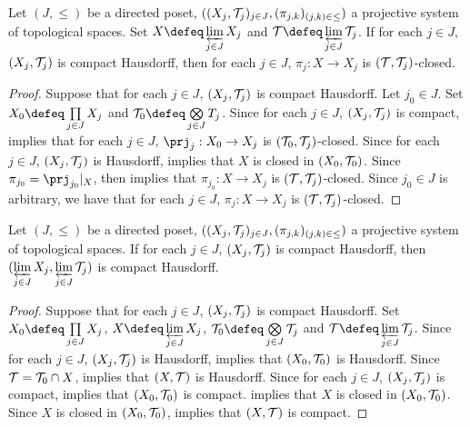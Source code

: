 \documentclass{book}
\begin{document}
\begin{ex} 
	Let $(J, \leq)$ be a directed poset, $((X_j, \mathcal{T}_j)_{j \in J}, (\pi_{j,k})_{(j,k) \in \leq})$ a projective system of topological spaces. Set $X \defeq \varprojlim\limits_{j \in J} X_j$ and $\MT \defeq \varprojlim\limits_{j \in J} \MT_j$. If for each $j \in J$, $(X_j, \mathcal{T}_j)$ is compact Hausdorff, then for each $j \in J$, $\pi_j: X \rightarrow X_j$ is $(\mathcal{T}, \mathcal{T}_j)$-closed.
\end{ex}

\begin{proof}
	Suppose that for each $j \in J$, $(X_j, \mathcal{T}_j)$ is compact Hausdorff. Let $j_0 \in J$. Set $X_0 \defeq \prod\limits_{j \in J} X_j$ and $\MT_0 \defeq \bigotimes\limits_{j \in J} T_j$. Since for each $j \in J$, $(X_j, \mathcal{T}_j)$ is compact,  implies that for each $j \in J$, $\prj_j: X_0 \rightarrow X_j$ is $(\mathcal{T}_0, \mathcal{T}_j)$-closed. Since for each $j \in J$, $(X_j, \mathcal{T}_j)$ is Hausdorff,  implies that $X$ is closed in $(X_0, \mathcal{T}_0)$. Since $\pi_{j_0} = \prj_{j_0}|_{X}$,  then implies that $\pi_{j_0}:X \rightarrow X_j$ is $(\mathcal{T}, \mathcal{T}_j)$-closed. Since $j_0 \in J$ is arbitrary, we have that for each $j \in J$, $\pi_j:X \rightarrow X_j$ is $(\mathcal{T}, \mathcal{T}_j)$-closed.
\end{proof}

\begin{ex} 
	Let $(J, \leq)$ be a directed poset, $((X_j, \mathcal{T}_j)_{j \in J}, (\pi_{j,k})_{(j,k) \in \leq})$ a projective system of topological spaces. If for each $j \in J$, $(X_j, \mathcal{T}_j)$ is compact Hausdorff, then $(\varprojlim\limits_{j \in J} X_j, \varprojlim\limits_{j \in J} \mathcal{T}_j)$ is compact Hausdorff. 
\end{ex}

\begin{proof}
	Suppose that for each $j \in J$, $(X_j, \mathcal{T}_j)$ is compact Hausdorff. Set $X_0 \defeq \prod\limits_{j \in J} X_j$, $X \defeq \varprojlim\limits_{j \in J} X_j$, $\MT_0 \defeq \bigotimes\limits_{j \in J} \MT_j$ and $\MT \defeq \varprojlim\limits_{j \in J} \MT_j$. Since for each $j \in J$, $(X_j, \mathcal{T}_j)$ is Hausdorff,  implies that $(X_0, \mathcal{T}_0)$ is Hausdorff. Since $\mathcal{T} = \mathcal{T}_0 \cap X$,  implies that $(X, \mathcal{T})$ is Hausdorff. Since for each $j \in J$, $(X_j, \mathcal{T}_j)$ is compact,  implies that $(X_0, \mathcal{T}_0)$ is compact.  implies that $X$ is closed in $(X_0, \mathcal{T}_0)$. Since $X$ is closed in $(X_0, \mathcal{T}_0)$,  implies that $(X, \mathcal{T})$ is compact. 
\end{proof}
\end{document}
